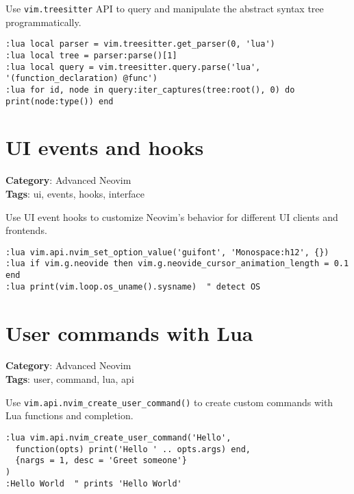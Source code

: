 Use {\footnotesize \Verb§vim.treesitter§} API to query and manipulate the abstract syntax tree programmatically.

\begin{Exa*}{}
\begin{Verbatim}[fontsize=\footnotesize, breaklines, breakanywhere]
:lua local parser = vim.treesitter.get_parser(0, 'lua')
:lua local tree = parser:parse()[1]
:lua local query = vim.treesitter.query.parse('lua', '(function_declaration) @func')
:lua for id, node in query:iter_captures(tree:root(), 0) do print(node:type()) end
\end{Verbatim}
\end{Exa*}

\section{UI events and hooks}

\textbf{Category}: Advanced Neovim\\ \textbf{Tags}: ui, events, hooks, interface
\vspace{0.5cm}

Use UI event hooks to customize Neovim's behavior for different UI clients and frontends.

\begin{Exa*}{}
\begin{Verbatim}[fontsize=\footnotesize, breaklines, breakanywhere]
:lua vim.api.nvim_set_option_value('guifont', 'Monospace:h12', {})
:lua if vim.g.neovide then vim.g.neovide_cursor_animation_length = 0.1 end
:lua print(vim.loop.os_uname().sysname)  " detect OS
\end{Verbatim}
\end{Exa*}

\section{User commands with Lua}

\textbf{Category}: Advanced Neovim\\ \textbf{Tags}: user, command, lua, api
\vspace{0.5cm}

Use {\footnotesize \Verb§vim.api.nvim_create_user_command()§} to create custom commands with Lua functions and completion.

\begin{Exa*}{}
\begin{Verbatim}[fontsize=\footnotesize, breaklines, breakanywhere]
:lua vim.api.nvim_create_user_command('Hello', 
  function(opts) print('Hello ' .. opts.args) end,
  {nargs = 1, desc = 'Greet someone'}
)
:Hello World  " prints 'Hello World'
\end{Verbatim}
\end{Exa*}

